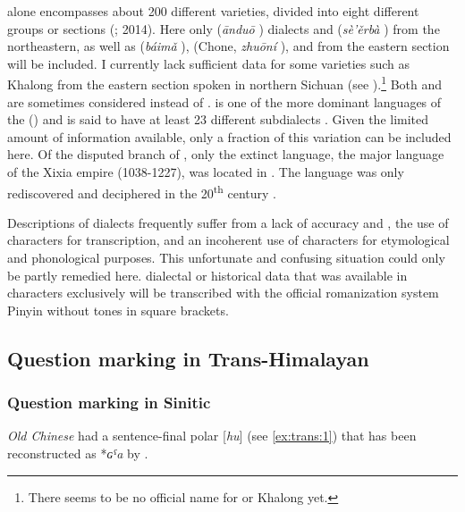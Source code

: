  alone encompasses about 200 different varieties, divided into eight different groups or sections (\citealt{Tournadre2005}; 2014). Here only  (\textit{ānduō} ) dialects and  (\textit{sè’ěrbà} ) from the northeastern, as well as  (\textit{báimǎ} ),  (Chone, \textit{zhuō}\textit{ní} ), and  from the eastern section will be included. I currently lack sufficient data for some varieties such as Khalong  from the eastern section spoken in northern Sichuan (see \citealt{Sun2007}).\footnote{There seems to be no official  name for  or Khalong yet.} Both  and  are sometimes considered  instead of .  is one of the more dominant languages of the  (\citealt{SandmanSimon2016}) and is said to have at least 23 different subdialects \citep[43]{Ebihara2011}. Given the limited amount of information available, only a fraction of this variation can be included here. Of the disputed  branch of , only the extinct  language, the major language of the Xixia empire (1038-1227), was located in . The language was only rediscovered and deciphered in the 20\textsuperscript{th} century \citep{Gong2003}.

Descriptions of  dialects frequently suffer from a lack of accuracy and , the use of characters for transcription, and an incoherent use of characters for etymological and phonological purposes. This unfortunate and confusing situation could only be partly remedied here.  dialectal or historical data that was available in  characters exclusively will be transcribed with the official romanization system Pinyin without tones in square brackets.

\subsection{Question marking in Trans-Himalayan}\label{sec:5.9.2}
\subsubsection{Question marking in Sinitic}\label{sec:5.9.2.1}

\textit{Old Chinese} had a sentence-final polar   [\textit{hu}] (see \ref{ex:trans:1}) that has been reconstructed as *\textit{ɢˤa} by \citet{BaxterSagart2014b}.

